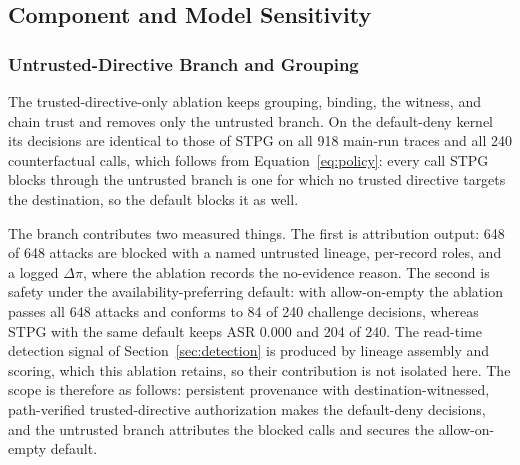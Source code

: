 \documentclass[applsci,article,submit,moreauthors]{Definitions/mdpi}
\begin{document}
\subsection{Component and Model Sensitivity}
\label{sec:sensitivity}
\subsubsection{Untrusted-Directive Branch and Grouping}
\label{sec:ablation}
\label{sec:grouping}
The trusted-directive-only ablation keeps grouping, binding, the witness, and chain trust and removes only the untrusted branch. On the default-deny kernel its decisions are identical to those of STPG on all 918 main-run traces and all 240 counterfactual calls, which follows from Equation~\eqref{eq:policy}: every call STPG blocks through the untrusted branch is one for which no trusted directive targets the destination, so the default blocks it as well.

The branch contributes two measured things. The first is attribution output: 648 of 648 attacks are blocked with a named untrusted lineage, per-record roles, and a logged $\Delta\pi$, where the ablation records the no-evidence reason. The second is safety under the availability-preferring default: with allow-on-empty the ablation passes all 648 attacks and conforms to 84 of 240 challenge decisions, whereas STPG with the same default keeps ASR 0.000 and 204 of 240. The read-time detection signal of Section~\ref{sec:detection} is produced by lineage assembly and scoring, which this ablation retains, so their contribution is not isolated here. The scope is therefore as follows: persistent provenance with destination-witnessed, path-verified trusted-directive authorization makes the default-deny decisions, and the untrusted branch attributes the blocked calls and secures the allow-on-empty default.
\end{document}
